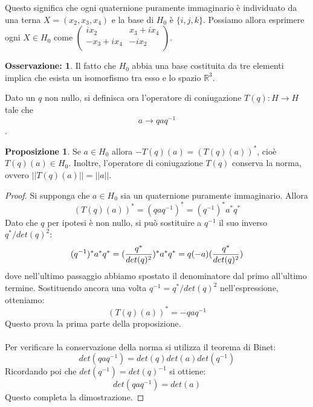 \documentclass[12pt,a4paper]{report}
\theoremstyle{definition}
\theoremstyle{Theorem}
\newtheorem{Prop}[Def]{Proposizione}
\theoremstyle{definition}
\theoremstyle{definition}
\theoremstyle{definition}
\newtheorem{Obs}[Def]{Osservazione:}
\begin{document}
Questo significa che ogni quaternione puramente immaginario è individuato da una terna $X=(x_2,x_3,x_4)$ e la base di $H_0$ è $\{i,j,k\}$. Possiamo allora esprimere ogni $X\in H_0$ come
$\begin{pmatrix}
	ix_2 & x_3+ix_4\\
	-x_3+ix_4 & -ix_2\\
\end{pmatrix}$.
\begin{Obs}
	Il fatto che $H_0$ abbia una base costituita da tre elementi implica che esista un isomorfismo tra esso e lo spazio $\mathbb{R}^3$.
\end{Obs}
Dato un $q$ non nullo, si definisca ora l'operatore di coniugazione
$T(q):H\longrightarrow H$ tale che
$$a\longrightarrow qaq^{-1}$$.
\begin{Prop}
	Se $a\in H_0$ allora $-T(q)(a)=(T(q)(a))^*$, cioè $T(q)(a)\in H_0$. Inoltre, l'operatore di coniugazione $T(q)$ conserva la norma, ovvero $||T(q)(a)||=||a||$.
\end{Prop}
\begin{proof}
	Si supponga che $a\in H_0$ sia un quaternione puramente immaginario. Allora $$(T(q)(a))^*=(qaq^{-1})^*=(q^{-1})^*a^*q^*$$
	Dato che $q$ per ipotesi è non nullo, si può sostituire a $q^{-1}$ il suo inverso $q^*/det(q)^2$:
	$$(q^{-1})^*a^*q^*=({q^*\over det(q)^2})^*a^*q^*=q(-a)({q^*\over det(q)^2})$$
	dove nell'ultimo passaggio abbiamo spostato il denominatore dal primo all'ultimo termine. Sostituendo ancora una volta $q^{-1}=q^*/det(q)^2$ nell'espressione, otteniamo:
	$$(T(q)(a))^*=-qaq^{-1}$$
	Questo prova la prima parte della proposizione.\\
	\\
	Per verificare la conservazione della norma si utilizza il teorema di Binet:
	$$det(qaq^{-1})=det(q)det(a)det(q^{-1})$$
	Ricordando poi che $det(q^{-1})=det(q)^{-1}$ si ottiene:
	$$det(qaq^{-1})=det(a)$$
	Questo completa la dimostrazione.
\end{proof}
\end{document}

